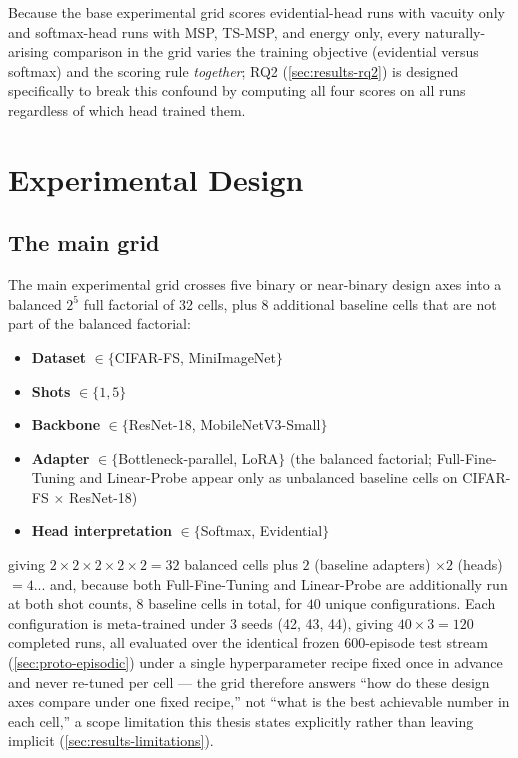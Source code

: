 \documentclass{iutbscthesis}
\begin{document}
Because the base experimental grid scores evidential-head runs with vacuity only and softmax-head runs with MSP, TS-MSP, and energy only, every naturally-arising comparison in the grid varies the training objective (evidential versus softmax) and the scoring rule \emph{together}; RQ2 (\autoref{sec:results-rq2}) is designed specifically to break this confound by computing all four scores on all runs regardless of which head trained them.

\section{Experimental Design}
\label{sec:method-grid-design}

\subsection{The main grid}

The main experimental grid crosses five binary or near-binary design axes into a balanced $2^5$ full factorial of 32 cells, plus 8 additional baseline cells that are not part of the balanced factorial:

\begin{itemize}
    \item \textbf{Dataset} $\in \{$CIFAR-FS, MiniImageNet$\}$
    \item \textbf{Shots} $\in \{1, 5\}$
    \item \textbf{Backbone} $\in \{$ResNet-18, MobileNetV3-Small$\}$
    \item \textbf{Adapter} $\in \{$Bottleneck-parallel, LoRA$\}$ (the balanced factorial; Full-Fine-Tuning and Linear-Probe appear only as unbalanced baseline cells on CIFAR-FS $\times$ ResNet-18)
    \item \textbf{Head interpretation} $\in \{$Softmax, Evidential$\}$
\end{itemize}

giving $2 \times 2 \times 2 \times 2 \times 2 = 32$ balanced cells plus $2$ (baseline adapters) $\times 2$ (heads) $= 4$... and, because both Full-Fine-Tuning and Linear-Probe are additionally run at both shot counts, $8$ baseline cells in total, for $40$ unique configurations. Each configuration is meta-trained under 3 seeds (42, 43, 44), giving $40 \times 3 = 120$ completed runs, all evaluated over the identical frozen 600-episode test stream (\autoref{sec:proto-episodic}) under a single hyperparameter recipe fixed once in advance and never re-tuned per cell — the grid therefore answers ``how do these design axes compare under one fixed recipe,'' not ``what is the best achievable number in each cell,'' a scope limitation this thesis states explicitly rather than leaving implicit (\autoref{sec:results-limitations}).
\end{document}
